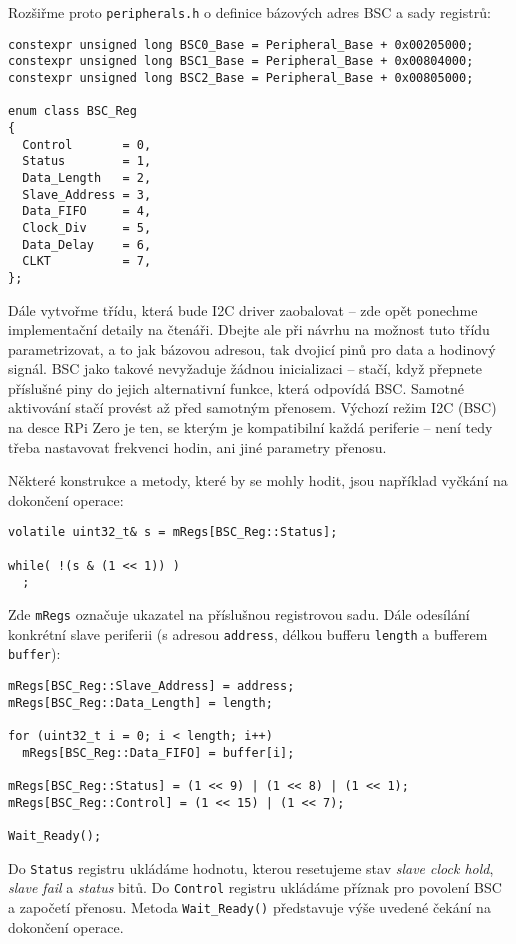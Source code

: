 \documentclass{article}
\begin{document}
Rozšiřme proto \texttt{peripherals.h} o definice bázových adres BSC a sady registrů:
\begin{lstlisting}
constexpr unsigned long BSC0_Base = Peripheral_Base + 0x00205000;
constexpr unsigned long BSC1_Base = Peripheral_Base + 0x00804000;
constexpr unsigned long BSC2_Base = Peripheral_Base + 0x00805000;

enum class BSC_Reg
{
  Control       = 0,
  Status        = 1,
  Data_Length   = 2,
  Slave_Address = 3,
  Data_FIFO     = 4,
  Clock_Div     = 5,
  Data_Delay    = 6,
  CLKT          = 7,
};
\end{lstlisting}
Dále vytvořme třídu, která bude I2C driver zaobalovat -- zde opět ponechme implementační detaily na čtenáři. Dbejte ale při návrhu na možnost tuto třídu parametrizovat, a to jak bázovou adresou, tak dvojicí pinů pro data a hodinový signál. BSC jako takové nevyžaduje žádnou inicializaci -- stačí, když přepnete příslušné piny do jejich alternativní funkce, která odpovídá BSC. Samotné aktivování stačí provést až před samotným přenosem. Výchozí režim I2C (BSC) na desce RPi Zero je ten, se kterým je kompatibilní každá periferie -- není tedy třeba nastavovat frekvenci hodin, ani jiné parametry přenosu.

Některé konstrukce a metody, které by se mohly hodit, jsou například vyčkání na dokončení operace:
\begin{lstlisting}
volatile uint32_t& s = mRegs[BSC_Reg::Status];

while( !(s & (1 << 1)) )
  ;
\end{lstlisting}
Zde \texttt{mRegs} označuje ukazatel na příslušnou registrovou sadu. Dále odesílání konkrétní slave periferii (s adresou \texttt{address}, délkou bufferu \texttt{length} a bufferem \texttt{buffer}):
\begin{lstlisting}
mRegs[BSC_Reg::Slave_Address] = address;
mRegs[BSC_Reg::Data_Length] = length;

for (uint32_t i = 0; i < length; i++)
  mRegs[BSC_Reg::Data_FIFO] = buffer[i];

mRegs[BSC_Reg::Status] = (1 << 9) | (1 << 8) | (1 << 1);
mRegs[BSC_Reg::Control] = (1 << 15) | (1 << 7);

Wait_Ready();
\end{lstlisting}
Do \texttt{Status} registru ukládáme hodnotu, kterou resetujeme stav \emph{slave clock hold}, \emph{slave fail} a \emph{status} bitů. Do \texttt{Control} registru ukládáme příznak pro povolení BSC a započetí přenosu. Metoda \texttt{Wait\_Ready()} představuje výše uvedené čekání na dokončení operace.
\end{document}
